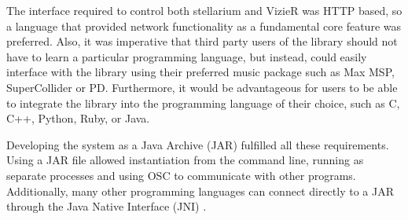 The interface required to control both stellarium and VizieR was HTTP based, so a language that provided network functionality as a fundamental core feature was preferred. Also, it was imperative that third party users of the library should not have to learn a particular programming language, but instead, could easily interface with the library using their preferred music package such as Max MSP, SuperCollider or PD. Furthermore, it would be advantageous for users to be able to integrate the library  into the programming language of their choice, such as C, C++, Python, Ruby, or Java.

Developing the system as a Java Archive (JAR) fulfilled all these requirements. Using a JAR file allowed instantiation from the command line, running as separate processes and using OSC to communicate with other programs. Additionally, many other programming languages can connect directly to a JAR through the Java Native Interface (JNI) \cite{liang1999java}. 
